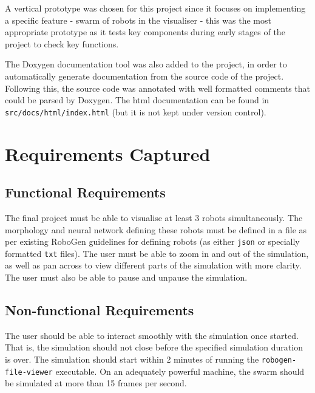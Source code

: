 \documentclass[11pt,a4paper]{article}
\begin{document}
A vertical prototype was chosen for this project since it focuses on
implementing a specific feature - swarm of robots in the visualiser - this was
the most appropriate prototype as it tests key components during early stages
of the project to check key functions.


The Doxygen documentation tool \cite{doxygen} was also added to the project, in
order to automatically generate documentation from the source code of the
project.  Following this, the source code was annotated with well formatted
comments that could be parsed by Doxygen. The html documentation can be found
in \texttt{src/docs/html/index.html} (but it is not kept under version
control).

\section{Requirements Captured}




\subsection{Functional Requirements}
The final project must be able to visualise at least 3 robots simultaneously.
The morphology and neural network defining these robots must be defined in a
file as per existing RoboGen guidelines for defining robots (as either
\texttt{json} or specially formatted \texttt{txt} files). The user must be able
to zoom in and out of the simulation, as well as pan across to view different
parts of the simulation with more clarity. The user must also be able to pause
and unpause the simulation.

\subsection{Non-functional Requirements}
The user should be able to interact smoothly with the simulation once started.
That is, the simulation should not close before the specified simulation
duration is over. The simulation should start within 2 minutes of running the
\texttt{robogen-file-viewer} executable. On an adequately powerful machine, the
swarm should be simulated at more than 15 frames per second.
\end{document}
